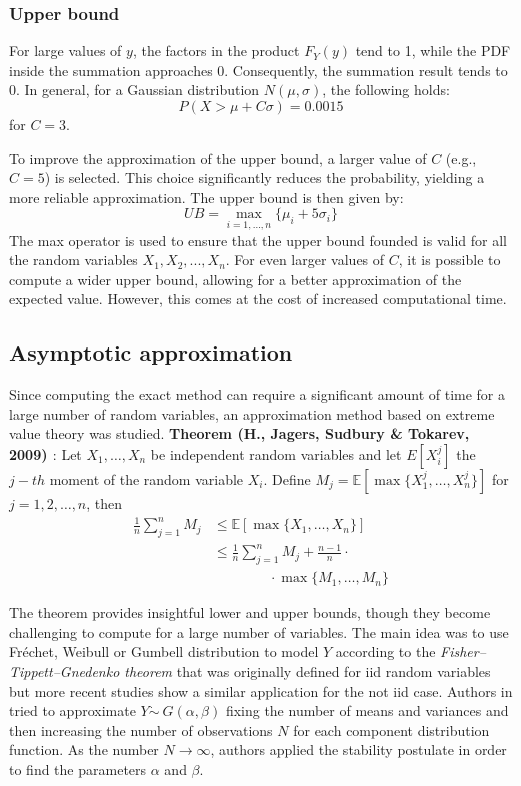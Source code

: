 \subsubsection{Upper bound}
For large values of \( y \), the factors in the product \( F_Y(y) \) tend to 1, while the PDF inside the summation approaches 0. Consequently, the summation result tends to 0. In general, for a Gaussian distribution \( N(\mu, \sigma) \), the following holds:
$$P(X > \mu + C \sigma) = 0.0015$$
for \( C = 3 \).

To improve the approximation of the upper bound, a larger value of \( C \) (e.g., \( C = 5 \)) is selected. This choice significantly reduces the probability, yielding a more reliable approximation. The upper bound is then given by:
$$UB = \max_{i=1, \ldots, n} \{\mu_i + 5 \sigma_i\}$$
The max operator is used to ensure that the upper bound founded is valid for all the random variables $X_1, X_2, ..., X_n$. For even larger values of \( C \), it is possible to compute a wider upper bound, allowing for a better approximation of the expected value. However, this comes at the cost of increased computational time.

\subsection{Asymptotic approximation}
Since computing the exact method can require a significant amount of time for a large number of random variables, an approximation method based on extreme value theory was studied.
\textbf{Theorem (H., Jagers, Sudbury \& Tokarev, 2009) \cite{hamza2009mixing}}: Let $X_1, \ldots, X_n$ be independent random variables and let $E[X_i^j]$ the $j-th$ moment of the random variable $X_i$. Define $M_j = \mathbb{E}[\max\{X_1^j, \ldots, X_n^j\}]$ for $j = 1, 2, \ldots, n$, then 
\begin{align*}
    \frac{1}{n} \sum_{j=1}^n M_j &\leq \mathbb{E}[\max\{X_1, \ldots, X_n\}] \\
    &\leq \frac{1}{n} \sum_{j=1}^n M_j + \frac{n-1}{n} \cdot \\ 
    & \qquad \qquad \cdot \max\{M_1, \ldots, M_n\}
\end{align*}

The theorem provides insightful lower and upper bounds, though they become challenging to compute for a large number of variables. The main idea was to use Fréchet, Weibull or Gumbell distribution to model $Y$ according to the \textit{Fisher–Tippett–Gnedenko theorem} \cite{fisher1928limiting} that was originally defined for iid random variables but more recent studies show a similar application for the not iid case. Authors in \cite{padua2013distribution} tried to approximate $Y \dot \sim \ G(\alpha, \beta)$ fixing the number of means and variances and then increasing the number of observations $N$ for each component distribution function. As the number $N \rightarrow \infty$, authors applied the stability postulate in order to find the parameters $\alpha$ and $\beta$.

